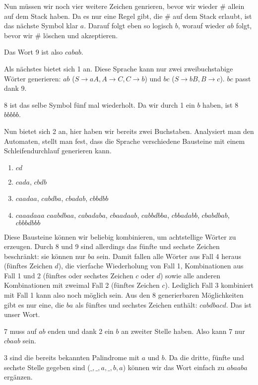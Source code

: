 \documentclass{article}
\begin{document}
Nun müssen wir noch vier weitere Zeichen genrieren, bevor wir wieder \# allein auf dem Stack haben. Da es nur eine Regel gibt, die \# auf dem Stack erlaubt, ist das nächste Symbol klar $a$. Darauf folgt eben so logisch $b$, worauf wieder $ab$ folgt, bevor wir \# löschen und akzeptieren.

Das Wort 9 ist also $cabab$.

\bigskip

Als nächstes bietet sich 1 an. Diese Sprache kann nur zwei zweibuchstabige Wörter generieren: $ab$ ($S\rightarrow aA, A\rightarrow C, C\rightarrow b$) und $bc$ ($S\rightarrow bB, B\rightarrow c$). $bc$ passt dank 9.

\bigskip

8 ist das selbe Symbol fünf mal wiederholt. Da wir durch 1 ein $b$ haben, ist 8 $bbbbb$.

\bigskip

Nun bietet sich 2 an, hier haben wir bereits zwei Buchstaben.
Analysiert man den Automaten, stellt man fest, dass die Sprache verschiedene Bausteine mit einem Schleifendurchlauf generieren kann.
\begin{enumerate}
	\item $cd$
  \item $cada$, $cbdb$
  \item $caadaa$, $cabdba$, $cbadab$, $cbbdbb$
  \item $caaadaaa$ $caabdbaa$, $cabadaba$, $cbaadaab$, $cabbdbba$, $cbbadabb$, $cbabdbab$, $cbbbdbbb$
\end{enumerate}
Diese Bausteine können wir beliebig kombinieren, um achtstellige Wörter zu erzeugen. Durch 8 und 9 sind allerdings das fünfte und sechste Zeichen beschränkt: sie können nur $ba$ sein.
Damit fallen alle Wörter aus Fall 4 heraus (fünftes Zeichen $d$), die vierfache Wiederholung von Fall 1, Kombinationen aus Fall 1 und 2 (fünftes oder sechstes Zeichen $c$ oder $d$) sowie alle anderen Kombinationen mit zweimal Fall 2 (fünftes Zeichen $c$).
Lediglich Fall 3 kombiniert mit Fall 1 kann also noch möglich sein. Aus den 8 generierbaren Möglichkeiten gibt es nur eine, die $ba$ als fünftes und sechstes Zeichen enthält: $cabdbacd$. Das ist unser Wort.

\bigskip

7 muss auf $ab$ enden und dank 2 ein $b$ an zweiter Stelle haben. Also kann 7 nur $cbaab$ sein.

\bigskip

3 sind die bereits bekannten Palindrome mit $a$ und $b$. Da die dritte, fünfte und sechste Stelle gegeben sind ($\_,\_,a,\_,b,a$) können wir das Wort einfach zu $abaaba$ ergänzen.
\end{document}
